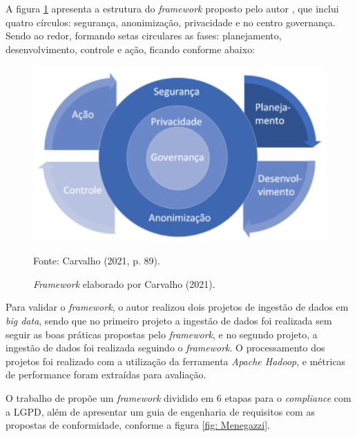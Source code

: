 \documentclass[
	12pt,				%
	openright,			%
	oneside,			%
	a4paper,			%
	english,			%
	french,				%
	spanish,			%
	brazil,				%
	]{abntex2}
\begin{document}
A figura \ref{fig: Carvalho} apresenta a estrutura do \textit{framework} proposto pelo autor \cite{Carvalho2021}, que inclui quatro círculos: segurança, anonimização, privacidade e no centro governança. Sendo ao redor, formando setas circulares as fases: planejamento, desenvolvimento, controle e ação, ficando conforme abaixo:

\begin{figure}[ht]
    \centering
    \caption{\textit{Framework} elaborado por Carvalho (2021).}
    \includegraphics[width=6in]{Images/08Carvalho2021.png}
    \label{fig: Carvalho}
    
    \centering \small Fonte: Carvalho (2021, p. 89).
\end{figure}

Para validar o \textit{framework}, o autor realizou dois projetos de ingestão de dados em \textit{big data}, sendo que no primeiro projeto a ingestão de dados foi realizada sem seguir as boas práticas propostas pelo \textit{framework}, e no segundo projeto, a ingestão de dados foi realizada seguindo o \textit{framework}. O processamento dos projetos foi realizado com a utilização da ferramenta \textit{Apache Hadoop}, e métricas de performance foram extraídas para avaliação.

\pagebreak

O trabalho de \cite{Menegazzi2021} propõe um \textit{framework} dividido em 6 etapas para o \textit{compliance} com a LGPD, além de apresentar um guia de engenharia de requisitos com as propostas de conformidade, conforme a figura \ref{fig: Menegazzi}.
\end{document}
